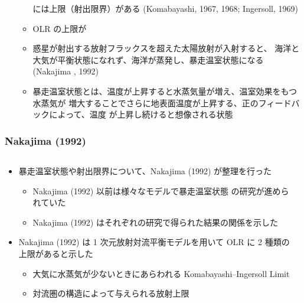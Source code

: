 \documentclass[aspectratio=149,9pt,]{beamer}
\begin{document}
\begin{frame}
\begin{itemize}
\begin{itemize}
					には上限（射出限界）がある (Komabayashi, 1967, 1968; Ingersoll, 1969)
				\item OLR の上限が
				\item 惑星が射出する放射フラックスを超えた太陽放射が入射すると、
					海洋と大気が平衡状態になれず、海洋が蒸発し、暴走温室状態になる
					(Nakajima \etal*, 1992)
				\item 暴走温室状態とは、温度が上昇すると水蒸気量が増え、温室効果をもつ水蒸気が
					増大することでさらに地表面温度が上昇する、正のフィードバックによって、温度
					が上昇し続けると想像される状態
			\end{itemize}
	\end{itemize}
\end{frame}

\begin{frame}
	\frametitle{Nakajima \etal (1992)}
	\begin{columns}[T,onlytextwidth]
		\begin{column}{.55\textwidth}
			\begin{itemize}
				\item 暴走温室状態や射出限界について、Nakajima \etal (1992) が整理を行った
					\begin{itemize}
						\item Nakajima \etal (1992) 以前は様々なモデルで暴走温室状態
							の研究が進められていた
						\item Nakajima \etal (1992) はそれぞれの研究で得られた結果の関係を示した
					\end{itemize}
				\item Nakajima \etal (1992) は 1 次元放射対流平衡モデルを用いて OLR に 2 種類の上限があると示した
					\begin{itemize}
						\item 大気に水蒸気が少ないときにあらわれる Komabayashi--Ingersoll Limit
						\item 対流圏の構造によって与えられる放射上限
					\end{itemize}
			\end{itemize}
		\end{column}
		\begin{column}{.4\textwidth}
			\centering

\end{column}
\end{columns}
\end{frame}
\end{document}
